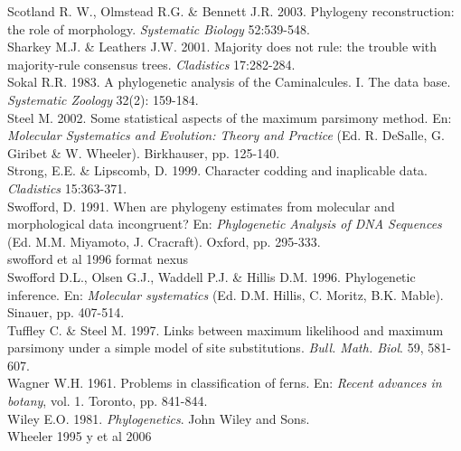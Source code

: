 Scotland R. W., Olmstead R.G. \& Bennett J.R. 2003. Phylogeny reconstruction: the role of morphology. \textit{Systematic Biology} 52:539-548.\\
Sharkey M.J. \& Leathers J.W. 2001. Majority does not rule: the trouble with majority-rule consensus trees. \textit{Cladistics} 17:282-284.\\
Sokal R.R. 1983. A phylogenetic analysis of the Caminalcules. I. The data base. \textit{Systematic Zoology} 32(2): 159-184.\\
Steel M. 2002. Some statistical aspects of the maximum parsimony method. En: \textit{Molecular Systematics and Evolution: Theory and Practice} (Ed. R. DeSalle, G. Giribet \& W. Wheeler). Birkhauser, pp. 125-140.\\
Strong, E.E. \& Lipscomb, D. 1999. Character codding and inaplicable data. \textit{Cladistics} 15:363-371.\\
Swofford, D. 1991. When are phylogeny estimates from molecular and morphological data incongruent? En: \textit{Phylogenetic Analysis of DNA Sequences} (Ed. M.M. Miyamoto, J. Cracraft). Oxford, pp. 295-333.\\
swofford et al 1996 format nexus\\
Swofford D.L., Olsen G.J., Waddell P.J. \& Hillis D.M. 1996. Phylogenetic inference. En: \textit{Molecular systematics} (Ed. D.M. Hillis, C. Moritz, B.K. Mable). Sinauer, pp. 407-514.\\
Tuffley C. \& Steel M. 1997. Links between maximum likelihood and maximum parsimony under a simple model of site substitutions. \textit{Bull. Math. Biol}. 59, 581-607.\\
Wagner W.H. 1961. Problems in classification of ferns. En: \textit{Recent advances in botany}, vol. 1. Toronto, pp. 841-844.\\
Wiley E.O. 1981. \textit{Phylogenetics}. John Wiley and Sons.\\
Wheeler 1995 y et al 2006